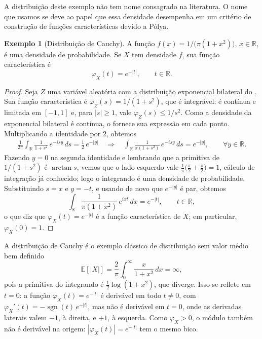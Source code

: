 \documentclass[12pt,portuguese]{article}
\theoremstyle{definition}
\newtheorem{example}[example]{Exemplo}
\theoremstyle{plainexercise}
\theoremstyle{starredexercise}
\theoremstyle{definition}
\begin{document}
A distribuição deste exemplo não tem nome consagrado na literatura. O nome que usamos
se deve ao papel que essa densidade desempenha em um critério de construção de funções
características devido a Pólya.

\medskip

\begin{example}[Distribuição de Cauchy]\label{ex:cauchy}
A função $f(x)=1/\bigl(\pi(1+x^{2})\bigr)$, $x\in\mathbb{R}$, é uma densidade de
probabilidade. Se $X$ tem densidade $f$, sua função característica é
\[
\varphi_X(t)=e^{-|t|}, \qquad t\in\mathbb{R}.
\]
\end{example}

\begin{proof}
Seja $Z$ uma variável aleatória com a distribuição exponencial bilateral do
. Sua função característica é
$\varphi_Z(s)=1/(1+s^{2})$, que é integrável: é contínua e limitada em $[-1,1]$ e, para $|s|\geqslant1$, vale
$\varphi_Z(s)\leqslant1/s^{2}$. Como a densidade da exponencial bilateral é contínua, o
 fornece sua expressão em cada ponto. Multiplicando
a identidade por $2$, obtemos
\begin{align*}
\frac{1}{2\pi}\int_{\mathbb{R}}\frac{1}{1+s^{2}}\,e^{-isy}\,ds
=\tfrac12\,e^{-|y|}
\quad \Longrightarrow \quad 
\int_{\mathbb{R}}\frac{1}{\pi(1+s^{2})}\,e^{-isy}\,ds
=e^{-|y|}, \qquad \forall y\in\mathbb{R}.
\end{align*}
Fazendo $y=0$ na segunda identidade e lembrando que a primitiva de $1/(1+s^{2})$ é
$\arctan s$, vemos que o lado esquerdo vale
$\frac{1}{\pi}\bigl(\frac{\pi}{2}+\frac{\pi}{2}\bigr)=1$, cálculo de integração já
conhecido; logo o integrando é uma densidade de probabilidade. Substituindo $s=x$ e
$y=-t$, e usando de novo que $e^{-|y|}$ é par, obtemos
\[
\int_{\mathbb{R}}\frac{1}{\pi(1+x^{2})}\,e^{ixt}\,dx=e^{-|t|},
\qquad t\in\mathbb{R},
\]
o que diz que $\varphi_X(t)=e^{-|t|}$ é a função característica de $X$;
em particular, $\varphi_X(0)=1$.
\end{proof}

A distribuição de Cauchy é o exemplo clássico de distribuição sem valor médio bem definido
\[
\mathbb{E}[|X|]=\frac{2}{\pi}\int_{0}^{\infty} \frac{x}{1+x^{2}} \,dx=\infty,
\]
pois a primitiva do integrando é $\tfrac12\log(1+x^{2})$, que diverge. Isso se reflete
em $t=0$: a função $\varphi_X(t)=e^{-|t|}$ é derivável em todo $t\neq0$, com
$\varphi_X'(t)=-\operatorname{sgn}(t)\,e^{-|t|}$, mas não é derivável em $t=0$, onde as
derivadas laterais valem $-1$, à direita, e $+1$, à esquerda. Como $\varphi_X>0$, o
módulo também não é derivável na origem: $|\varphi_X(t)|=e^{-|t|}$ tem o mesmo bico.
\end{document}
